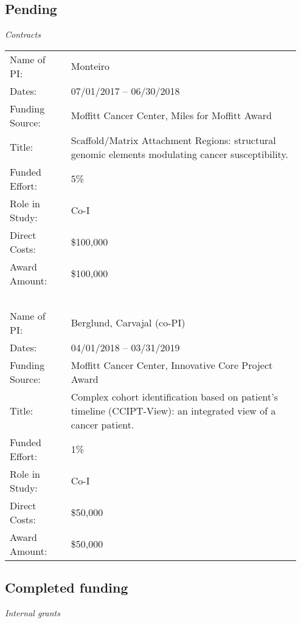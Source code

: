 \documentclass[11pt, a4paper]{article} %
\begin{document}

\subsection*{Pending}


\emph{Contracts}
\begin{longtable}{@{}p{0.2\linewidth} p{0.75\linewidth}}
Name of PI: & Monteiro \\
Dates: & 07/01/2017 -- 06/30/2018\\
Funding Source: & Moffitt Cancer Center, Miles for Moffitt Award\\
Title: & Scaffold/Matrix Attachment Regions: structural genomic elements modulating cancer susceptibility.\\
Funded Effort: & 5\%\\
Role in Study: & Co-I \\
Direct Costs: & \$100,000\\
Award Amount: & \$100,000\\
~\\
Name of PI: & Berglund, Carvajal (co-PI) \\
Dates: & 04/01/2018 -- 03/31/2019\\
Funding Source: & Moffitt Cancer Center, Innovative Core Project Award\\
Title: & Complex cohort identification based on patient's timeline (CCIPT-View): an integrated view of a cancer patient.\\
Funded Effort: & 1\%\\
Role in Study: & Co-I \\
Direct Costs: & \$50,000\\
Award Amount: & \$50,000\\
\end{longtable}

\subsection*{Completed funding}
\emph{Internal grants}
\end{document}
